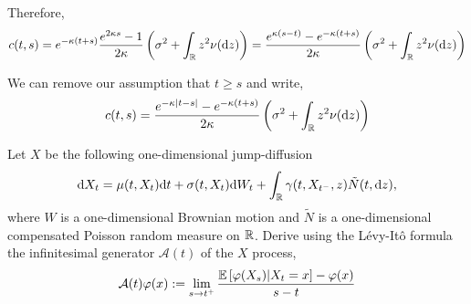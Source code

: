 \documentclass[10pt]{article}
\begin{document}
\begin{solution}[Solution]
\begin{enumerate}[label=(\alph*)]
        Therefore, 
        \begin{align*}
            c(t,s) 
            = e^{-\kappa(t+s)}\dfrac{e^{2\kappa s}-1}{2\kappa} \left(\sigma^2 + \int_{\mathbb{R}} z^2 \nu(\mathrm{d} z) \right)
            = \dfrac{e^{\kappa(s-t)}-e^{-\kappa(t+s)}}{2\kappa} \left(\sigma^2 + \int_{\mathbb{R}} z^2 \nu(\mathrm{d} z) \right)
        \end{align*} 

        We can remove our assumption that \( t\geq s \) and write,
        \begin{align*}
            c(t,s)  
            = \dfrac{e^{-\kappa|t-s|} - e^{-\kappa(t+s)}}{2\kappa} \left(\sigma^2 + \int_{\mathbb{R}} z^2 \nu(\mathrm{d} z) \right)
        \end{align*}
\end{enumerate}
\end{solution}

\begin{problem}[Exercise 10.5]
Let \( X \) be the following one-dimensional jump-diffusion
\begin{align*}
    \mathrm{d} X_t = \mu(t,X_t)\mathrm{d} t + \sigma(t,X_t)\mathrm{d} W_t + \int_{\mathbb{R}} \gamma(t,X_{t^-},z) \tilde{N}(t,\mathrm{d} z),
\end{align*}
    where \( W \) is a one-dimensional Brownian motion and \( \tilde{N} \) is a one-dimensional compensated Poisson random measure on \( \mathbb{R} \). Derive using the L\'evy-It\^o formula the infinitesimal generator \( \mathcal{A} (t) \) of the \( X \) process,
    \begin{align*}
        \mathcal{A}(t) \varphi(x) := \lim_{s\to t^+} \dfrac{\mathbb{E} \left[ \varphi(X_s) | X_t = x \right]-\varphi(x)}{s-t}
    \end{align*}
\end{problem}
\end{document}
